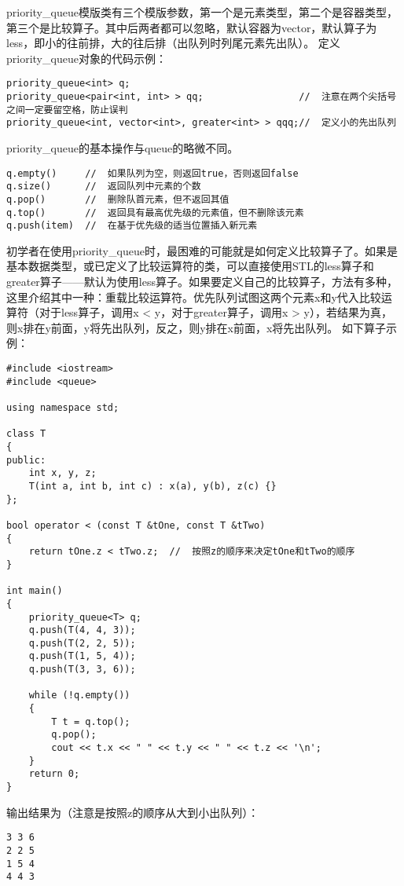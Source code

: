priority\_queue模版类有三个模版参数，第一个是元素类型，第二个是容器类型，第三个是比较算子。其中后两者都可以忽略，默认容器为vector，默认算子为less，即小的往前排，大的往后排（出队列时列尾元素先出队）。 
定义priority\_queue对象的代码示例：

\begin{lstlisting}
priority_queue<int> q;
priority_queue<pair<int, int> > qq;                 //  注意在两个尖括号之间一定要留空格，防止误判
priority_queue<int, vector<int>, greater<int> > qqq;//  定义小的先出队列
\end{lstlisting}

priority\_queue的基本操作与queue的略微不同。

\begin{lstlisting}
q.empty()     //  如果队列为空，则返回true，否则返回false
q.size()      //  返回队列中元素的个数
q.pop()       //  删除队首元素，但不返回其值
q.top()       //  返回具有最高优先级的元素值，但不删除该元素
q.push(item)  //  在基于优先级的适当位置插入新元素
\end{lstlisting}

初学者在使用priority\_queue时，最困难的可能就是如何定义比较算子了。如果是基本数据类型，或已定义了比较运算符的类，可以直接使用STL的less算子和greater算子——默认为使用less算子。如果要定义自己的比较算子，方法有多种，这里介绍其中一种：重载比较运算符。优先队列试图这两个元素x和y代入比较运算符（对于less算子，调用x < y，对于greater算子，调用x > y），若结果为真，则x排在y前面，y将先出队列，反之，则y排在x前面，x将先出队列。 
如下算子示例：

\begin{lstlisting}
#include <iostream>
#include <queue>

using namespace std;

class T
{
public:
    int x, y, z;
    T(int a, int b, int c) : x(a), y(b), z(c) {}
};

bool operator < (const T &tOne, const T &tTwo)
{
    return tOne.z < tTwo.z;  //  按照z的顺序来决定tOne和tTwo的顺序
}

int main()
{
    priority_queue<T> q;
    q.push(T(4, 4, 3));
    q.push(T(2, 2, 5));
    q.push(T(1, 5, 4));
    q.push(T(3, 3, 6));

    while (!q.empty())
    {
        T t = q.top();
        q.pop();
        cout << t.x << " " << t.y << " " << t.z << '\n';
    }
    return 0;
}
\end{lstlisting}

输出结果为（注意是按照z的顺序从大到小出队列）： 
\begin{lstlisting}
3 3 6 
2 2 5 
1 5 4 
4 4 3
\end{lstlisting}

